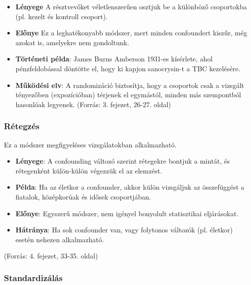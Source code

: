 \documentclass[a4paper,12pt]{article}
\begin{document}
    \begin{itemize}
        \item \textbf{Lényege}
        A résztvevőket véletlenszerűen osztjuk be a különböző csoportokba (pl. kezelt és kontroll csoport).

        \item \textbf{Előnye}
        Ez a leghatékonyabb módszer, mert minden confoundert kiszűr, még azokat is, amelyekre nem gondoltunk.

        \item \textbf{Történeti példa}:
        James Burns Amberson 1931-es kísérlete, ahol pénzfeldobással döntötte el, hogy ki kapjon sanocrysin-t a TBC kezelésére.

        \item \textbf{Működési elv}:
        A randomizáció biztosítja, hogy a csoportok csak a vizsgált tényezőben (expozícióban) térjenek el egymástól, minden más szempontból hasonlóak legyenek.
        (Forrás: 3. fejezet, 26-27. oldal)

    \end{itemize}

    \subsubsection{Rétegzés}

    Ez a módszer megfigyeléses vizsgálatokban alkalmazható.

    \begin{itemize}
        \item \textbf{Lényege}: A confounding változó szerint rétegekre bontjuk a mintát, és rétegenként külön-külön végezzük el az elemzést.
        \item \textbf{Példa}: Ha az életkor a confounder, akkor külön vizsgáljuk az összefüggést a fiatalok, középkorúak és idősek csoportjában.
        \item \textbf{Előnye}: Egyszerű módszer, nem igényel bonyolult statisztikai eljárásokat.
        \item \textbf{Hátránya}: Ha sok confounder van, vagy folytonos változók (pl. életkor) esetén nehezen alkalmazható.
    \end{itemize}
    (Forrás: 4. fejezet, 33-35. oldal)

    \subsubsection{Standardizálás}
\end{document}
